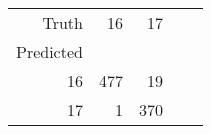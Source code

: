 \begin{tabular}{rrrrr}
\toprule
Truth & 16 & 17 \\
Predicted &  &  \\
\midrule
16 & 477 & 19 \\
17 & 1 & 370 \\
\bottomrule
\end{tabular}
